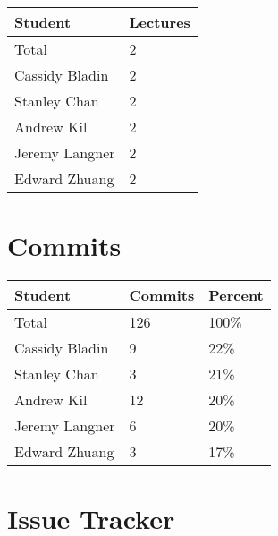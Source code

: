 \documentclass{article}
\begin{document}

\begin{table}[H]
\centering
\begin{tabular}{ll}
\toprule
\textbf{Student} & \textbf{Lectures}\\
\midrule
Total & 2\\
Cassidy Bladin & 2\\
Stanley Chan & 2\\
Andrew Kil & 2\\
Jeremy Langner & 2\\
Edward Zhuang & 2\\
\bottomrule
\end{tabular}
\end{table}

\section{Commits}


\begin{table}[H]
\centering
\begin{tabular}{lll}
\toprule
\textbf{Student} & \textbf{Commits} & \textbf{Percent}\\
\midrule
Total & 126 & 100\% \\
Cassidy Bladin & 9 & 22\% \\
Stanley Chan & 3 & 21\% \\
Andrew Kil & 12 & 20\% \\
Jeremy Langner & 6 & 20\% \\
Edward Zhuang & 3 & 17\% \\
\bottomrule
\end{tabular}
\end{table}

\section{Issue Tracker}

\end{document}
